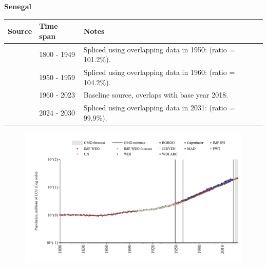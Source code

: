 \documentclass[12pt,a4paper,landscape]{article}
\begin{document}
\begin{adjustbox}{max totalsize={\paperwidth}{\paperheight},center}
\begin{minipage}[t][\textheight][t]{\textwidth}
\vspace*{0.5cm}
{}
\begin{center}
{\Large\bfseries Senegal}
\end{center}
\vspace{0.5cm}
\begin{table}[H]
\centering
\small
\begin{tabular}{|l|l|l|}
\hline
\textbf{Source} & \textbf{Time span} & \textbf{Notes} \\
\hline
\rowcolor{white}\cite{Gapminder}& 1800 - 1949 &Spliced using overlapping data in 1950: (ratio = 101.2\%).\\
\rowcolor{lightgray}\cite{IMF_IFS}& 1950 - 1959 &Spliced using overlapping data in 1960: (ratio = 104.2\%).\\
\rowcolor{white}\cite{WDI}& 1960 - 2023 &Baseline source, overlaps with base year 2018.\\
\rowcolor{lightgray}\cite{Gapminder}& 2024 - 2030 &Spliced using overlapping data in 2031: (ratio = 99.9\%).\\
\hline
\end{tabular}
\end{table}
\begin{figure}[H]
\centering
\includegraphics[width=\textwidth,height=0.6\textheight,keepaspectratio]{graphs/SEN_pop.pdf}
\end{figure}
\end{minipage}
\end{adjustbox}
\end{document}
